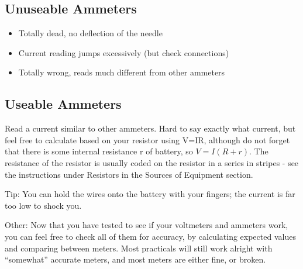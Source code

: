 \subsection{Unuseable Ammeters} 	
\begin{itemize}
\item{Totally dead, 
no deflection of the needle}
\item{Current reading jumps excessively (but check connections)}
\item{Totally wrong, 
reads much different from other ammeters}
\end{itemize}

\subsection{Useable Ammeters}
Read a current similar to other ammeters. 
Hard to say exactly what current, 
but feel free to calculate based on your resistor using V=IR, 
although do not forget that there is 
some internal resistance r of battery, 
so $V=I(R+r)$. 
The resistance of the resistor is usually coded 
on the resistor in a series in stripes - 
see the instructions under Resistors in the Sources of Equipment section.

Tip: You can hold the wires onto the battery with your fingers; 
the current is far too low to shock you.

Other: Now that you have tested to see 
if your voltmeters and ammeters work, 
you can feel free to check all of them for accuracy, 
by calculating expected values and comparing between meters. 
Most practicals will still work alright with “somewhat” accurate meters, 
and most meters are either fine, 
or broken.
